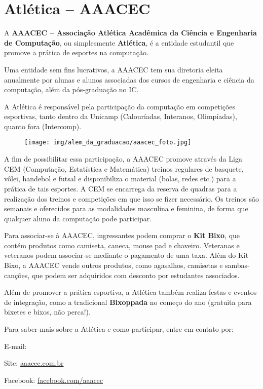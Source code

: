 
\section{Atlética -- AAACEC}

A \textbf{AAACEC -- Associação Atlética Acadêmica da Ciência e Engenharia de
Computação}, ou simplesmente \textbf{Atlética}, é a entidade estudantil que
promove a prática de esportes na computação.

Uma entidade sem fins lucrativos, a AAACEC tem sua diretoria eleita anualmente
por alunas e alunos associadas dos cursos de engenharia e ciência da
computação, além da pós-graduação no IC.

A Atlética é responsável pela participação da computação em competições
esportivas, tanto dentro da Unicamp (Calouríadas, Interanos, Olimpíadas),
quanto fora (Intercomp).

\begin{figure}[H]
  \centering
  \texttt{[image: img/alem\_da\_graduacao/aaacec\_foto.jpg]}
\end{figure}

A fim de possibilitar essa participação, a AAACEC promove através da Liga CEM
(Computação, Estatística e Matemática) treinos regulares de basquete, vôlei,
handebol e futsal e disponibiliza o material (bolas, redes etc.) para a 
prática de tais esportes. A CEM se encarrega da reserva de quadras para
a realização dos treinos e competições em que isso se fizer necessário. 
Os treinos são semanais e oferecidos para as modalidades masculina e 
feminina, de forma que qualquer aluno da computação pode participar.

Para associar-se à AAACEC, ingressantes podem comprar o \textbf{Kit Bixo},
que contém produtos co\-mo camiseta, caneca, mouse pad e chaveiro. Veteranas
e veteranos podem associar-se mediante o pagamento de uma taxa. Além do Kit
Bixo, a AAACEC vende outros produtos, como agasalhos, camisetas e sambas-
canções, que podem ser adquiridos com desconto por estudantes associados.

Além de promover a prática esportiva, a Atlética também realiza festas e
eventos de integração, como a tradicional \textbf{Bixoppada} no
começo do ano (gratuita para bixetes e bixos, não perca!).

Para saber mais sobre a Atlética e como participar, entre em contato por:
\begin{compactitemize}
\item E-mail: 
\item Site: \url{aaacec.com.br}
\item Facebook: \url{facebook.com/aaacec}
\end{compactitemize}
